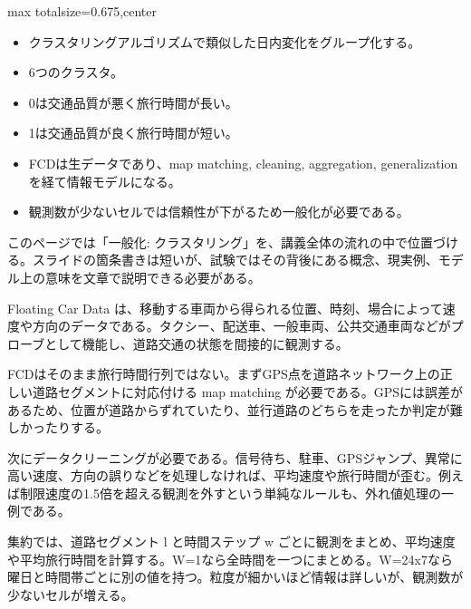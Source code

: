 \clearpage
{}
\begin{adjustbox}{max totalsize={\textwidth}{0.675\textheight},center}
\begin{minipage}{\textwidth}\scriptsize
\begin{minipage}[t]{0.485\textwidth}
\begin{itemize}
\item クラスタリングアルゴリズムで類似した日内変化をグループ化する。
\item 6つのクラスタ。
\item 0は交通品質が悪く旅行時間が長い。
\item 1は交通品質が良く旅行時間が短い。
\end{itemize}
\begin{itemize}
\item FCDは生データであり、map matching, cleaning, aggregation, generalization を経て情報モデルになる。
\item 観測数が少ないセルでは信頼性が下がるため一般化が必要である。
\end{itemize}
\end{minipage}\hfill
\begin{minipage}[t]{0.485\textwidth}
このページでは「一般化: クラスタリング」を、講義全体の流れの中で位置づける。スライドの箇条書きは短いが、試験ではその背後にある概念、現実例、モデル上の意味を文章で説明できる必要がある。\par
Floating Car Data は、移動する車両から得られる位置、時刻、場合によって速度や方向のデータである。タクシー、配送車、一般車両、公共交通車両などがプローブとして機能し、道路交通の状態を間接的に観測する。\par
FCDはそのまま旅行時間行列ではない。まずGPS点を道路ネットワーク上の正しい道路セグメントに対応付ける map matching が必要である。GPSには誤差があるため、位置が道路からずれていたり、並行道路のどちらを走ったか判定が難しかったりする。\par
次にデータクリーニングが必要である。信号待ち、駐車、GPSジャンプ、異常に高い速度、方向の誤りなどを処理しなければ、平均速度や旅行時間が歪む。例えば制限速度の1.5倍を超える観測を外すという単純なルールも、外れ値処理の一例である。\par
集約では、道路セグメント l と時間ステップ w ごとに観測をまとめ、平均速度や平均旅行時間を計算する。W=1なら全時間を一つにまとめる。W=24x7なら曜日と時間帯ごとに別の値を持つ。粒度が細かいほど情報は詳しいが、観測数が少ないセルが増える。\par

\end{minipage}
\end{minipage}
\end{adjustbox}
